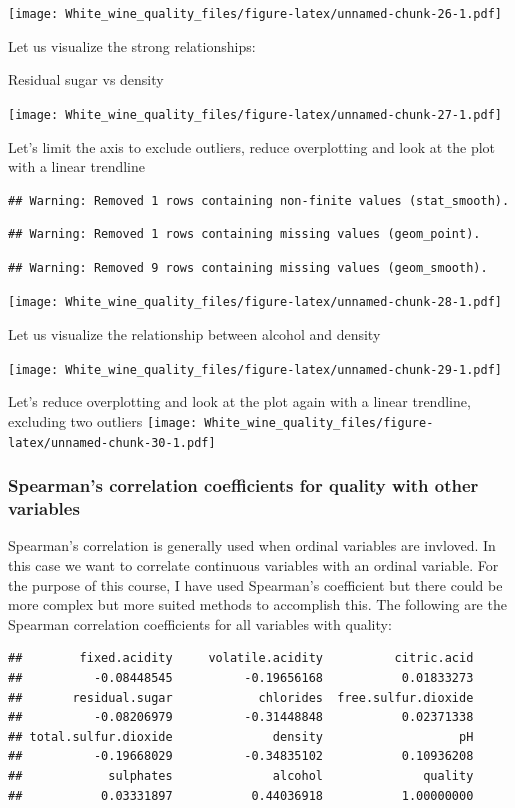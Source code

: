 \documentclass[]{article}
\begin{document}
\texttt{[image: White\_wine\_quality\_files/figure-latex/unnamed-chunk-26-1.pdf]}

Let us visualize the strong relationships:

Residual sugar vs density

\texttt{[image: White\_wine\_quality\_files/figure-latex/unnamed-chunk-27-1.pdf]}

Let's limit the axis to exclude outliers, reduce overplotting and look
at the plot with a linear trendline

\begin{verbatim}
## Warning: Removed 1 rows containing non-finite values (stat_smooth).
\end{verbatim}

\begin{verbatim}
## Warning: Removed 1 rows containing missing values (geom_point).
\end{verbatim}

\begin{verbatim}
## Warning: Removed 9 rows containing missing values (geom_smooth).
\end{verbatim}

\texttt{[image: White\_wine\_quality\_files/figure-latex/unnamed-chunk-28-1.pdf]}

Let us visualize the relationship between alcohol and density

\texttt{[image: White\_wine\_quality\_files/figure-latex/unnamed-chunk-29-1.pdf]}

Let's reduce overplotting and look at the plot again with a linear
trendline, excluding two outliers
\texttt{[image: White\_wine\_quality\_files/figure-latex/unnamed-chunk-30-1.pdf]}

\subsubsection{Spearman's correlation coefficients for quality with
other
variables}\label{spearmans-correlation-coefficients-for-quality-with-other-variables}

Spearman's correlation is generally used when ordinal variables are
invloved. In this case we want to correlate continuous variables with an
ordinal variable. For the purpose of this course, I have used Spearman's
coefficient but there could be more complex but more suited methods to
accomplish this. The following are the Spearman correlation coefficients
for all variables with quality:

\begin{verbatim}
##        fixed.acidity     volatile.acidity          citric.acid 
##          -0.08448545          -0.19656168           0.01833273 
##       residual.sugar            chlorides  free.sulfur.dioxide 
##          -0.08206979          -0.31448848           0.02371338 
## total.sulfur.dioxide              density                   pH 
##          -0.19668029          -0.34835102           0.10936208 
##            sulphates              alcohol              quality 
##           0.03331897           0.44036918           1.00000000
\end{verbatim}
\end{document}
